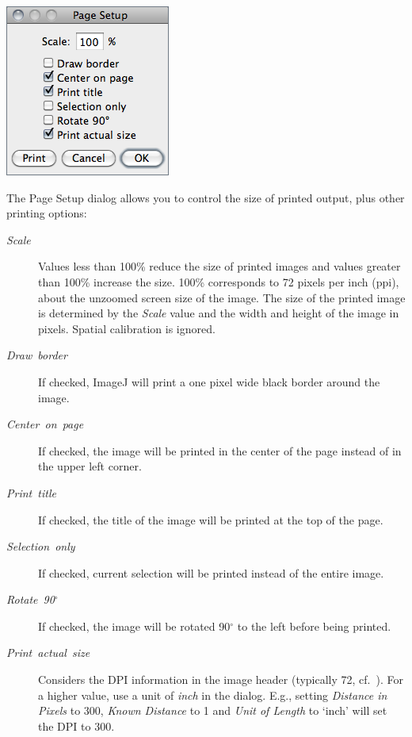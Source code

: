 \begin{minipage}[c][1\totalheight][t]{0.305\columnwidth}%
\includegraphics[scale=0.55]{images/PageSetup}%
\end{minipage}%
\begin{minipage}[c][1\totalheight][t]{0.695\columnwidth}%
The Page Setup dialog allows you to control the size of printed output,
plus other printing options:
\begin{description}
\item [{\emph{Scale}}] Values less than 100\% reduce the size of printed
images and values greater than 100\% increase the size. 100\% corresponds
to 72 pixels per inch (ppi),
about the unzoomed screen size of the image. The size of the printed
image is determined by the \emph{Scale} value and the width and height
of the image in pixels. Spatial calibration is ignored.\end{description}
%
\end{minipage}
\begin{description}
\item [{\emph{Draw\ border}}] If checked, ImageJ will print a one pixel
wide black border around the image. 
\item [{\emph{Center\ on\ page}}] If checked, the image will be printed
in the center of the page instead of in the upper left corner.
\item [{\emph{Print\ title}}] If checked, the title of the image will
be printed at the top of the page.
\item [{\emph{Selection\ only}}] If checked, current selection will be
printed instead of the entire image.
\item [{\emph{Rotate}\ \emph{90}\textmd{\emph{$^{\circ}$}}}] If checked,
the image will be rotated 90$^{\circ}$ to the left before being printed.
\item [{\emph{Print\ actual\ size}}] Considers the DPI information in
the image header (typically 72, cf.\ ).
For a higher value, use a unit of \emph{inch} in the 
dialog. E.g., setting \emph{Distance in Pixels }to 300, \emph{Known
Distance} to 1 and \emph{Unit of Length} to `inch' will set the
DPI to 300.
\end{description}

